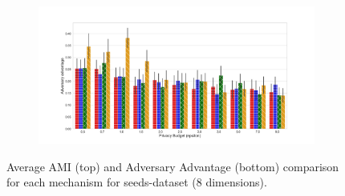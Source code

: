 \begin{figure}[H]
\begin{subfigure}{1\textwidth}
      \end{subfigure}
      \begin{subfigure}{1\textwidth}
            \includegraphics[width=1\textwidth]{Results/kd-laplace/shokri_mi_adv_seeds-dataset_comparison.png}
      \end{subfigure}
      \caption{Average AMI (top) and Adversary Advantage (bottom) comparison for each mechanism for seeds-dataset (8 dimensions).}
      \label{fig:utility_seeds-dataset_comparison_nd_plot}
\end{figure}
\newpage


